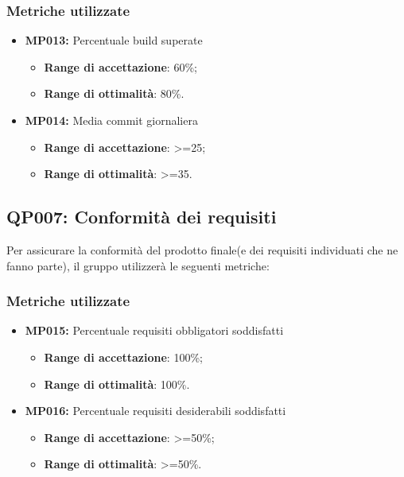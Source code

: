 \subsubsection{Metriche utilizzate}
\begin{itemize}
	\item \textbf{MP013:} Percentuale build superate
	\begin{itemize}
		\item \textbf{Range di accettazione}: 60\%;
		\item \textbf{Range di ottimalità}: 80\%.
	\end{itemize}
	\item \textbf{MP014:} Media commit giornaliera
	\begin{itemize}
		\item \textbf{Range di accettazione}: >=25;
		\item \textbf{Range di ottimalità}: >=35.
	\end{itemize}
\end{itemize}

\subsection{QP007: Conformità dei requisiti}
Per assicurare la conformità del prodotto finale(e dei requisiti individuati che ne fanno parte), il gruppo utilizzerà le seguenti metriche:

\subsubsection{Metriche utilizzate}
\begin{itemize}
	\item \textbf{MP015:} Percentuale requisiti obbligatori soddisfatti
	\begin{itemize}
		\item \textbf{Range di accettazione}: 100\%;
		\item \textbf{Range di ottimalità}: 100\%.
	\end{itemize}
	\item \textbf{MP016:} Percentuale requisiti desiderabili soddisfatti
	\begin{itemize}
		\item \textbf{Range di accettazione}: >=50\%;
		\item \textbf{Range di ottimalità}: >=50\%.
	\end{itemize}
\end{itemize}

